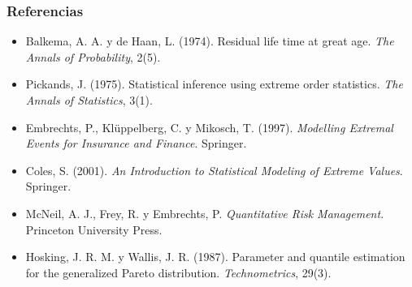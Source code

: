 \documentclass[a4paper,12pt]{article}
\begin{document}
\subsubsection*{Referencias}
\begin{itemize}[leftmargin=*,itemsep=0pt]
\item Balkema, A. A. y de Haan, L. (1974). Residual life time at great age. \emph{The Annals of Probability}, 2(5).
\item Pickands, J. (1975). Statistical inference using extreme order statistics. \emph{The Annals of Statistics}, 3(1).
\item Embrechts, P., Kl\"uppelberg, C. y Mikosch, T. (1997). \emph{Modelling Extremal Events for Insurance and Finance}. Springer.
\item Coles, S. (2001). \emph{An Introduction to Statistical Modeling of Extreme Values}. Springer.
\item McNeil, A. J., Frey, R. y Embrechts, P. \emph{Quantitative Risk Management}. Princeton University Press.
\item Hosking, J. R. M. y Wallis, J. R. (1987). Parameter and quantile estimation for the generalized Pareto distribution. \emph{Technometrics}, 29(3).
\end{itemize}
\end{document}
